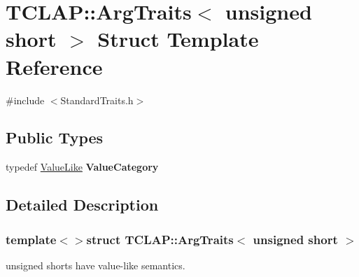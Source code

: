 \hypertarget{struct_t_c_l_a_p_1_1_arg_traits_3_01unsigned_01short_01_4}{\section{T\-C\-L\-A\-P\-:\-:Arg\-Traits$<$ unsigned short $>$ Struct Template Reference}
\label{struct_t_c_l_a_p_1_1_arg_traits_3_01unsigned_01short_01_4}
}


{\ttfamily \#include $<$Standard\-Traits.\-h$>$}

\subsection*{Public Types}
\begin{DoxyCompactItemize}
\item 
\hypertarget{struct_t_c_l_a_p_1_1_arg_traits_3_01unsigned_01short_01_4_a0efa2ce53e9cb98dc4a58dda24127d3a}{typedef \hyperlink{struct_t_c_l_a_p_1_1_value_like}{Value\-Like} {\bfseries Value\-Category}}\label{struct_t_c_l_a_p_1_1_arg_traits_3_01unsigned_01short_01_4_a0efa2ce53e9cb98dc4a58dda24127d3a}

\end{DoxyCompactItemize}


\subsection{Detailed Description}
\subsubsection*{template$<$$>$struct T\-C\-L\-A\-P\-::\-Arg\-Traits$<$ unsigned short $>$}

unsigned shorts have value-\/like semantics. 